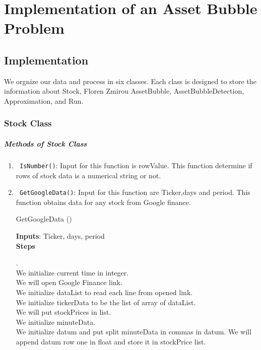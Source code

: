 
\chapter{Implementation of an Asset Bubble Problem}
\section{Implementation}
We orgnize our data and process in six classes. Each class is designed to store the information about Stock, Floren Zmirou
AssetBubble, AssetBubbleDetection, Approximation, and Run.
\subsection{Stock Class}
\paragraph{Methods of Stock Class}
\begin{enumerate}
  \item \verb! IsNumber()!: Input for this function is rowValue. This function determine if rows of stock data is a numerical string or not.
  \item \verb! GetGoogleData()!: Input for this function are Ticker,days and period. This function obtains data for any stock from Google
  finance.
  \begin{algorithm}
  \caption{GetGoogleData ()}
  \bigskip
  \textbf{Inputs}: Ticker, days, period\\
  \textbf{Steps}
  \begin{algorithmic}[1]
  .
  \Else 
  \EndIf\\
  We initialize current time in integer.\\
  We will open Google Finance link.\\
  We initialize dataList to read each line from opened link.\\
  We initialize tickerData to be the list of array of dataList.\\
  We will put stockPrices in list.\\
  We initialize  minuteData.\\
  \State We initialize datum and put split minuteData in commas in datum.
  \State We will append datum row one in float and store it in stockPrice list.\\
  
  
  \end{algorithmic}
  \end{algorithm}
 
\end{enumerate}


